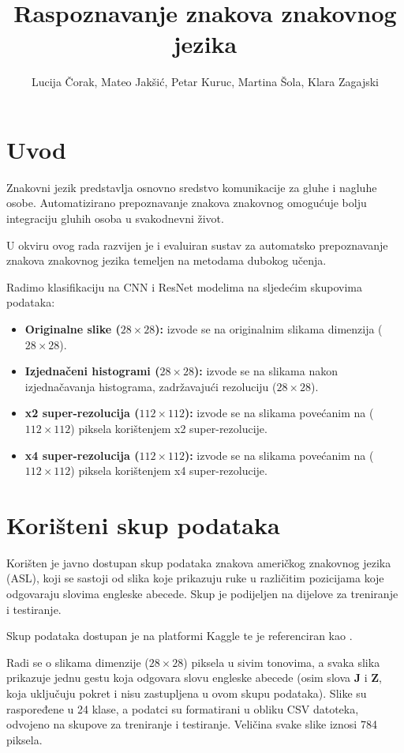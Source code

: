 \documentclass[a4paper,twocolumn]{article}
\title{Raspoznavanje znakova znakovnog jezika}
\author{Lucija Čorak, Mateo Jakšić, Petar Kuruc, Martina Šola, Klara Zagajski}
\date{}
\begin{document}
\maketitle


\section{Uvod}

Znakovni jezik predstavlja osnovno sredstvo komunikacije za gluhe i nagluhe osobe. Automatizirano prepoznavanje znakova znakovnog omogućuje bolju integraciju gluhih osoba u svakodnevni život.


U okviru ovog rada razvijen je i evaluiran sustav za automatsko prepoznavanje znakova znakovnog jezika temeljen na metodama dubokog učenja.

Radimo klasifikaciju na CNN i ResNet modelima na sljedećim skupovima podataka:
\begin{itemize}
    \item \textbf{Originalne slike ($28 \times 28$):} 
    izvode se na originalnim slikama dimenzija ($28 \times 28$).
    \item \textbf{Izjednačeni histogrami ($28 \times 28$):} izvode se na slikama nakon izjednačavanja histograma, zadržavajući rezoluciju ($28 \times 28$).
    \item \textbf{x2 super-rezolucija ($112 \times 112$):}  izvode se na slikama povećanim na ($112 \times 112$) piksela korištenjem x2 super-rezolucije.
    \item \textbf{x4 super-rezolucija ($112 \times 112$):}  izvode se na slikama povećanim na ($112 \times 112$) piksela korištenjem x4 super-rezolucije.
\end{itemize}



\section{Korišteni skup podataka}

Korišten je javno dostupan skup podataka znakova američkog znakovnog jezika (ASL), koji se sastoji od slika koje prikazuju ruke u različitim pozicijama koje odgovaraju slovima engleske abecede. Skup je podijeljen na dijelove za treniranje i testiranje.

Skup podataka dostupan je na platformi Kaggle te je referenciran kao \cite{asl_dataset}.

Radi se o slikama dimenzije ($28 \times 28$) piksela u sivim tonovima, a svaka slika prikazuje jednu gestu koja odgovara slovu engleske abecede (osim slova \textbf{J} i \textbf{Z}, koja uključuju pokret i nisu zastupljena u ovom skupu podataka). Slike su raspoređene u 24 klase, a podatci su formatirani u obliku CSV datoteka, odvojeno na skupove za treniranje i testiranje. Veličina svake slike iznosi 784 piksela.
\end{document}
